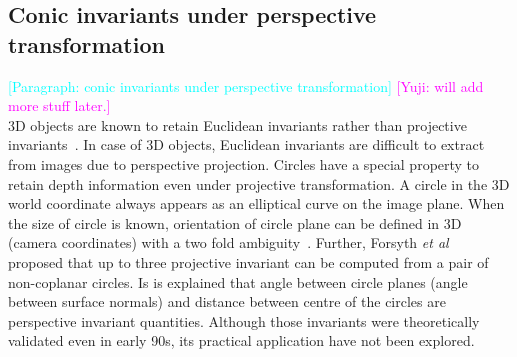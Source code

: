 \documentclass{bmvc2k}
\newcommand{\parmessage}[1]{\textcolor{cyan}{[Paragraph: #1]}}
\newcommand{\yuji}[1]{\textcolor{magenta}{[Yuji: #1]}}
\def\etal{\emph{et al}\bmvaOneDot}
\begin{document}
\subsection{Conic invariants under perspective transformation}
\parmessage{conic invariants under perspective transformation}
\yuji{will add more stuff later.}\\
3D objects are known to retain Euclidean invariants rather than projective invariants~\cite{forsyth_91}.
In case of 3D objects, Euclidean invariants are difficult to extract from images due to perspective projection.
Circles have a special property to retain depth information even under projective transformation.
A circle in the 3D world coordinate always appears as an elliptical curve on the image plane.
When the size of circle is known, orientation of circle plane can be defined in 3D (camera coordinates) with a two fold ambiguity~\cite{forsyth_91,safaee-rad_three-dimensional_1992}.
Further, Forsyth \etal~\cite{forsyth_91} proposed that up to three projective invariant can be computed from a pair of non-coplanar circles.
Is is explained that angle between circle planes (angle between surface normals) and distance between centre of the circles are perspective invariant quantities.
Although those invariants were theoretically validated even in early 90s, its practical application have not been explored.
\end{document}
